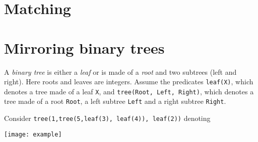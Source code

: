 \documentclass[11pt,a4paper]{article}
\author{Christian Rinderknecht}
\date{19 October 2006}
\begin{document}
\maketitle
\thispagestyle{empty}

\section{Matching}



\section{Mirroring binary trees}

\begin{multicols}{2}
\noindent A \emph{binary tree} is either a \emph{leaf} or is made of a
\emph{root} and two subtrees (left and right). Here roots and leaves
are integers. Assume the predicates \texttt{leaf(X)}, which denotes a
tree made of a leaf \texttt{X}, and \texttt{tree(Root, Left, Right)},
which denotes a tree made of a root \texttt{Root}, a left subtree
\texttt{Left} and a right subtree \texttt{Right}.

\columnbreak
\noindent Consider \texttt{tree(1,tree(5,leaf(3), leaf(4)),
  leaf(2))} denoting
\begin{center}
\texttt{[image: example]}
\end{center}
\end{multicols}


\end{document}

